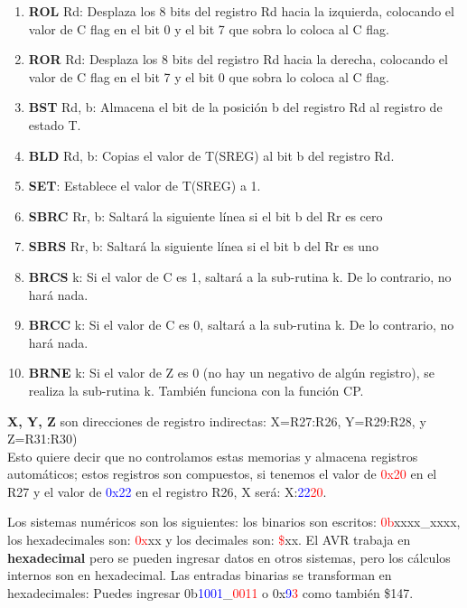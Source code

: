 \documentclass[
	12pt, %
	fleqn, %
	a4paper, %
]{LegrandOrangeBook}
\begin{document}
\begin{enumerate}
\item \textbf{ROL} Rd: Desplaza los 8 bits del registro Rd hacia la izquierda, colocando el valor de C flag en el bit 0 y el bit 7 que sobra lo coloca al C flag.
\item \textbf{ROR} Rd: Desplaza los 8 bits del registro Rd hacia la derecha, colocando el valor de C flag en el bit 7 y el bit 0 que sobra lo coloca al C flag.
\item \textbf{BST} Rd, b: Almacena el bit de la posición b del registro Rd al registro de estado T.
\item \textbf{BLD} Rd, b: Copias el valor de T(SREG) al bit b del registro Rd.
\item \textbf{SET}: Establece el valor de T(SREG) a 1.
\item \textbf{SBRC} Rr, b: Saltará la siguiente línea si el bit b del Rr es cero
\item \textbf{SBRS} Rr, b: Saltará la siguiente línea si el bit b del Rr es uno
\item \textbf{BRCS} k: Si el valor de C es 1, saltará a la sub-rutina k. De lo contrario, no hará nada.
\item \textbf{BRCC} k: Si el valor de C es 0, saltará a la sub-rutina k. De lo contrario, no hará nada.
\item \textbf{BRNE} k: Si el valor de Z es 0 (no hay un negativo de algún registro), se realiza la sub-rutina k. También funciona con la función CP.
\end{enumerate}
\begin{definition}
\textbf{X, Y, Z} son direcciones de registro indirectas: X=R27:R26, Y=R29:R28, y
Z=R31:R30)\\
Esto quiere decir que no controlamos estas memorias y almacena registros automáticos; estos registros son compuestos, si tenemos el valor de \textcolor{red}{0x20} en el R27 y el valor de \textcolor{blue}{0x22} en el registro R26, X será: X:\textcolor{blue}{22}\textcolor{red}{20}. 
\end{definition}
\begin{remark}
Los sistemas numéricos son los siguientes: los binarios son escritos: \textcolor{red}{0b}xxxx\_xxxx, los hexadecimales son: \textcolor{red}{0x}xx y los decimales son: \textcolor{red}{\$}xx. El AVR trabaja en \textbf{hexadecimal} pero se pueden ingresar datos en otros sistemas, pero los cálculos internos son en hexadecimal. Las entradas binarias se transforman en hexadecimales: Puedes ingresar 0b\textcolor{blue}{1001}\_\textcolor{red}{0011} o 0x\textcolor{blue}{9}\textcolor{red}{3} como también \$147.
\end{remark}
\end{document}
